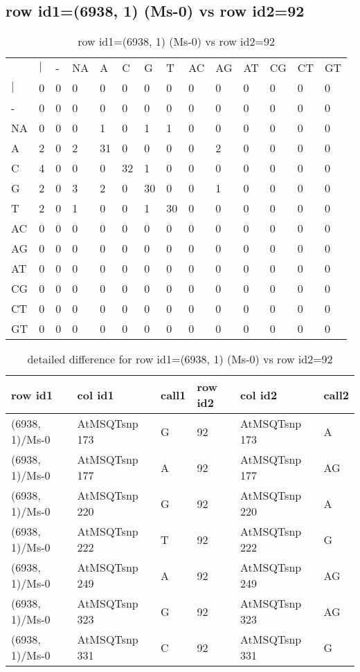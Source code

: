 \subsection{row id1=(6938, 1) (Ms-0) vs row id2=92}
\begin{center}
\begin{longtable}{|l|l|l|l|l|l|l|l|l|l|l|l|l|l|}
\caption{row id1=(6938, 1) (Ms-0) vs row id2=92} \label{table_dm138}\\
\hline
\\
\hline
&$|$&-&NA&A&C&G&T&AC&AG&AT&CG&CT&GT\\
$|$&0&0&0&0&0&0&0&0&0&0&0&0&0\\
-&0&0&0&0&0&0&0&0&0&0&0&0&0\\
NA&0&0&0&1&0&1&1&0&0&0&0&0&0\\
A&2&0&2&31&0&0&0&0&2&0&0&0&0\\
C&4&0&0&0&32&1&0&0&0&0&0&0&0\\
G&2&0&3&2&0&30&0&0&1&0&0&0&0\\
T&2&0&1&0&0&1&30&0&0&0&0&0&0\\
AC&0&0&0&0&0&0&0&0&0&0&0&0&0\\
AG&0&0&0&0&0&0&0&0&0&0&0&0&0\\
AT&0&0&0&0&0&0&0&0&0&0&0&0&0\\
CG&0&0&0&0&0&0&0&0&0&0&0&0&0\\
CT&0&0&0&0&0&0&0&0&0&0&0&0&0\\
GT&0&0&0&0&0&0&0&0&0&0&0&0&0\\
\hline
\end{longtable}
\end{center}

\begin{center}
\begin{longtable}{|l|l|l|l|l|l|}
\caption{detailed difference for row id1=(6938, 1) (Ms-0) vs row id2=92} \label{table_dm139}\\
\hline
row id1&col id1&call1&row id2&col id2&call2\\
\hline
(6938, 1)/Ms-0&AtMSQTsnp 173&G&92&AtMSQTsnp 173&A\\
(6938, 1)/Ms-0&AtMSQTsnp 177&A&92&AtMSQTsnp 177&AG\\
(6938, 1)/Ms-0&AtMSQTsnp 220&G&92&AtMSQTsnp 220&A\\
(6938, 1)/Ms-0&AtMSQTsnp 222&T&92&AtMSQTsnp 222&G\\
(6938, 1)/Ms-0&AtMSQTsnp 249&A&92&AtMSQTsnp 249&AG\\
(6938, 1)/Ms-0&AtMSQTsnp 323&G&92&AtMSQTsnp 323&AG\\
(6938, 1)/Ms-0&AtMSQTsnp 331&C&92&AtMSQTsnp 331&G\\
\hline
\end{longtable}
\end{center}

